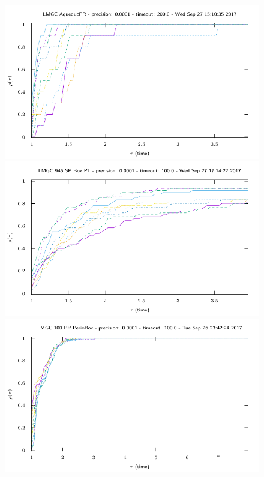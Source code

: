 \begin{figure}
\includegraphics[width=\figwidth]{../figure/NSGS/LocalTol/1.0e-04/200/time/profile-LMGC_AqueducPR.pdf} 
\includegraphics[width=\figwidth]{../figure/NSGS/LocalTol/1.0e-04/100/time/profile-LMGC_945_SP_Box_PL.pdf} 
\includegraphics[width=\figwidth]{../figure/NSGS/LocalTol/1.0e-04/100/time/profile-LMGC_100_PR_PerioBox.pdf} 

\end{figure}
